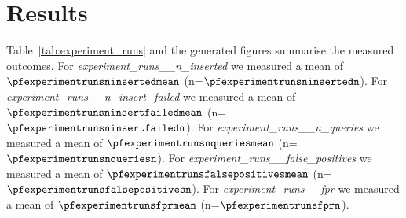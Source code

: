 \section{Results}
\label{sec:results}
Table~\ref{tab:experiment_runs} and the generated figures summarise the measured outcomes.
For \textit{experiment_runs__n_inserted} we measured a mean of $\pfexperimentrunsninsertedmean$ (n=$\pfexperimentrunsninsertedn$).
For \textit{experiment_runs__n_insert_failed} we measured a mean of $\pfexperimentrunsninsertfailedmean$ (n=$\pfexperimentrunsninsertfailedn$).
For \textit{experiment_runs__n_queries} we measured a mean of $\pfexperimentrunsnqueriesmean$ (n=$\pfexperimentrunsnqueriesn$).
For \textit{experiment_runs__false_positives} we measured a mean of $\pfexperimentrunsfalsepositivesmean$ (n=$\pfexperimentrunsfalsepositivesn$).
For \textit{experiment_runs__fpr} we measured a mean of $\pfexperimentrunsfprmean$ (n=$\pfexperimentrunsfprn$).
